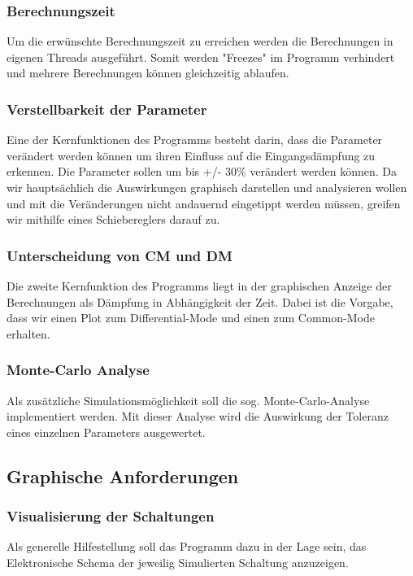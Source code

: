 \subsubsection{Berechnungszeit}\label{subsubsec:berechnungszeit}
Um die erwünschte Berechnungszeit zu erreichen werden die Berechnungen in eigenen Threads ausgeführt. Somit werden "Freezes" im Programm verhindert und mehrere Berechnungen können gleichzeitig ablaufen. 
\bigskip
\subsubsection{Verstellbarkeit der Parameter}\label{subsubsec:verstellbarkeitderparameter}
Eine der Kernfunktionen des Programms besteht darin, dass die Parameter verändert werden können um ihren Einfluss auf die Eingangsdämpfung zu erkennen. Die Parameter sollen um bis +/- 30\% verändert werden können. Da wir hauptsächlich die Auswirkungen graphisch darstellen und analysieren wollen und mit die Veränderungen nicht andauernd eingetippt werden müssen, greifen wir mithilfe eines Schiebereglers darauf zu. 
\bigskip
\subsubsection{Unterscheidung von CM und DM}\label{subsubsec:unterschiedCmDm}
Die zweite Kernfunktion des Programms liegt in der graphischen Anzeige der Berechnungen als Dämpfung in Abhängigkeit der Zeit. Dabei ist die Vorgabe, dass wir einen Plot zum Differential-Mode und einen zum Common-Mode erhalten.
		
\bigskip
\subsubsection{Monte-Carlo Analyse}\label{subsubsec:montecarlo}
Als zusätzliche Simulationsmöglichkeit soll die sog. Monte-Carlo-Analyse implementiert werden. Mit dieser Analyse wird die Auswirkung der Toleranz eines einzelnen Parameters ausgewertet. 
		
		
\subsection{Graphische Anforderungen} \label{subsec:graphischeanforderungen}

\bigskip
\subsubsection{Visualisierung der Schaltungen} \label{subsubsec:visualisierungderschaltungen}
Als generelle Hilfestellung soll das Programm dazu in der Lage sein, das Elektronische Schema der jeweilig Simulierten Schaltung anzuzeigen.
\bigskip
